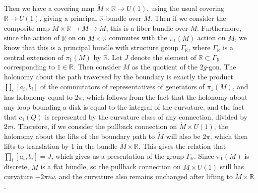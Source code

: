 \documentclass[psamsfonts, 12pt]{amsart}
\theoremstyle{definition}
\theoremstyle{remark}
\newcommand{\R}{\mathbb{R}}
\begin{document}
%
Then we have a covering map $\widetilde{M} \times \R \to U(1)$, using the usual
covering $\R \to U(1)$, giving a principal $\R$-bundle over $\widetilde{M}$. Then
if we consider the composite map $\widetilde{M} \times \R \to \widetilde{M} \to M$,
this is a fiber bundle over $M$. Furthermore, since the action of $\R$
on on $\widetilde{M} \times \R$ commutes with the $\pi_1(M)$ action on $\widetilde{M}$,
we know that this is a principal bundle with structure group $\Gamma_\R$, where
$\Gamma_\R$ is a central extension of $\pi_1(M)$ by $\R$. Let $J$ denote the
element of $\R \subset \Gamma_\R$ corresponding to $1 \in \R$. Then consider
$M$ as the quotient of the $2g$-gon. The holonomy about the path traversed by
the boundary is exactly the product $\prod_i [a_i,b_i]$ of the commutators of
representatives of generators of $\pi_1(M)$, and has holonomy equal to $2\pi$, which
follows from the fact that the holonomy about any loop bounding a disk is equal to the
integral of the curvature, and the fact that $c_1(Q)$ is represented by
the curvature class of any connection, divided by $2\pi i$. Therefore, if we
consider the pullback connection on $\widetilde{M} \times U(1)$, the holonomy
about the lifts of the boundary path to $\widetilde{M}$ will also be $2\pi$,
which then lifts to translation by $1$ in the bundle $\widetilde{M} \times \R$.
This gives the relation that $\prod_i [a_i,b_i] = J$, which gives us a presentation
of the group $\Gamma_\R$. Since $\pi_1(M)$ is discrete, $\widetilde{M}$ is a flat
bundle, so the pullback connection on $\widetilde{M} \times U(1)$ still has curvature
$-2\pi i \omega$, and the curvature also remains unchanged after lifting to
$\widetilde{M} \times \R$. \\
\end{document}
